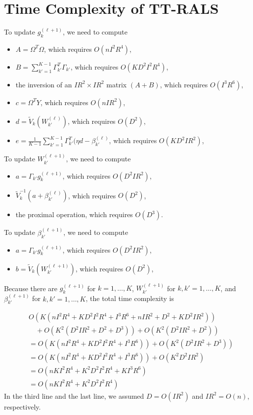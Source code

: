 \section{Time Complexity of TT-RALS}

To update $g_k^{(\ell + 1)}$, we need to compute
\begin{itemize}
\item $A = \Omega^T \Omega$, which requires $O(nI^2R^4)$,
\item $B = \sum_{k'=1}^{K-1} \Gamma_{k'}^{T}\Gamma_{k'}$, which requires
  $O(KD^2I^2R^4)$,
\item the inversion of an $IR^2 \times IR^2$ matrix
  $(A+B)$, which requires $O(I^3R^6)$,
\item $c=\Omega^T Y$, which requires $O(nIR^2)$,
\item $d=\tilde{V}_k(W_{k'}^{(\ell)})$, which requires $O(D^2)$,
\item
  $e=\frac{1}{K-1}\sum_{k'=1}^{K-1} \Gamma_{k'}^{T}( \eta d -
  \beta_{k'}^{(\ell)}$, which requires $O(KD^2IR^2)$,
\end{itemize}

To update $W_{k'}^{(\ell + 1)}$, we need to compute
\begin{itemize}
\item $a = \Gamma_{k'} g_k^{(\ell+1)}$, which requires $O(D^2IR^2)$,
\item $\tilde{V}_k^{-1} ( a +\beta_{k'}^{(\ell)} )$, which requires $O(D^2)$,
\item the proximal operation, which requires $O(D^3)$.
\end{itemize}


To update $\beta_{k'}^{(\ell + 1)}$, we need to compute
\begin{itemize}
\item $a = \Gamma_{k'} g_k^{(\ell+1)}$, which requires $O(D^2IR^2)$,
\item $b=\tilde{V}_k(W_{k'}^{(\ell + 1)})$, which requires $O(D^2)$,
\end{itemize}

Because there are $g_k^{(\ell + 1)}$ for $k=1,\dots,K$, 
$W_{k'}^{(\ell + 1)}$ for $k,k'=1,\dots,K$, and
$\beta_{k'}^{(\ell + 1)}$ for $k,k'=1,\dots,K$, the total time complexity is 

\begin{align*}
 &O(K(nI^2R^4 + KD^2I^2R^4 + I^3R^6 + nIR^2 + D^2 + KD^2IR^2))
\\
& \quad + O(K^2(D^2IR^2 + D^2 + D^3))+ O(K^2(D^2IR^2 + D^2))
\\
&= 
  O(K(nI^2R^4 + KD^2I^2R^4 + I^3R^6))
+ O(K^2(D^2IR^2 + D^3))
\\
&= 
  O(K(nI^2R^4 + KD^2I^2R^4 + I^3R^6))
+ O(K^2D^2IR^2)
\\
&= 
  O(nKI^2R^4 + K^2D^2I^2R^4 + KI^3R^6)
\\
&= 
  O(nKI^2R^4 + K^2D^2I^2R^4)
\end{align*}
In the third line and the last line, we assumed $D=O(IR^2)$ and $IR^2=O(n)$, respectively.

